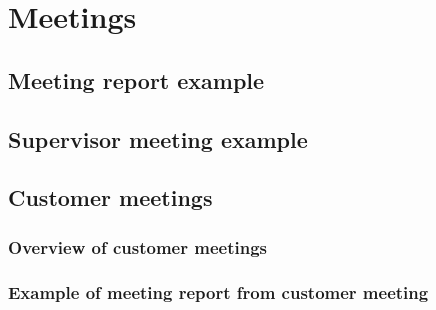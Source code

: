 \chapter{Meetings}
\section{Meeting report example}
\section{Supervisor meeting example}
\section{Customer meetings}
\subsection{Overview of customer meetings}
\subsection{Example of meeting report from customer meeting}